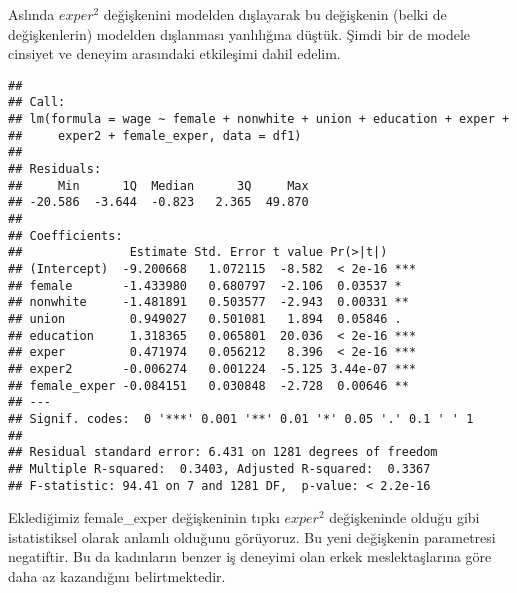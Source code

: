 \documentclass[
]{book}
\newenvironment{Shaded}{\begin{snugshade}}{\end{snugshade}}
\newcommand{\DataTypeTok}[1]{\textcolor[rgb]{0.13,0.29,0.53}{#1}}
\newcommand{\KeywordTok}[1]{\textcolor[rgb]{0.13,0.29,0.53}{\textbf{#1}}}
\newcommand{\NormalTok}[1]{#1}
\newcommand{\OperatorTok}[1]{\textcolor[rgb]{0.81,0.36,0.00}{\textbf{#1}}}
\newcommand{\StringTok}[1]{\textcolor[rgb]{0.31,0.60,0.02}{#1}}
\begin{document}
Aslında \(exper^2\) değişkenini modelden dışlayarak bu değişkenin (belki de değişkenlerin) modelden dışlanması yanlılığına düştük. Şimdi bir de modele cinsiyet ve deneyim arasındaki etkileşimi dahil edelim.

\begin{Shaded}
\end{Shaded}

\begin{verbatim}
## 
## Call:
## lm(formula = wage ~ female + nonwhite + union + education + exper + 
##     exper2 + female_exper, data = df1)
## 
## Residuals:
##     Min      1Q  Median      3Q     Max 
## -20.586  -3.644  -0.823   2.365  49.870 
## 
## Coefficients:
##               Estimate Std. Error t value Pr(>|t|)    
## (Intercept)  -9.200668   1.072115  -8.582  < 2e-16 ***
## female       -1.433980   0.680797  -2.106  0.03537 *  
## nonwhite     -1.481891   0.503577  -2.943  0.00331 ** 
## union         0.949027   0.501081   1.894  0.05846 .  
## education     1.318365   0.065801  20.036  < 2e-16 ***
## exper         0.471974   0.056212   8.396  < 2e-16 ***
## exper2       -0.006274   0.001224  -5.125 3.44e-07 ***
## female_exper -0.084151   0.030848  -2.728  0.00646 ** 
## ---
## Signif. codes:  0 '***' 0.001 '**' 0.01 '*' 0.05 '.' 0.1 ' ' 1
## 
## Residual standard error: 6.431 on 1281 degrees of freedom
## Multiple R-squared:  0.3403, Adjusted R-squared:  0.3367 
## F-statistic: 94.41 on 7 and 1281 DF,  p-value: < 2.2e-16
\end{verbatim}

Eklediğimiz female\_exper değişkeninin tıpkı \(exper^2\) değişkeninde olduğu gibi istatistiksel olarak anlamlı olduğunu görüyoruz. Bu yeni değişkenin parametresi negatiftir. Bu da kadınların benzer iş deneyimi olan erkek meslektaşlarına göre daha az kazandığını belirtmektedir.
\end{document}
